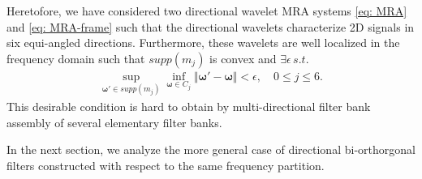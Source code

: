 

Heretofore, we have considered two directional wavelet MRA systems \eqref{eq: MRA} and \eqref{eq: MRA-frame} such that the directional wavelets characterize 2D signals in six equi-angled directions. 
Furthermore, these wavelets are well localized in the frequency domain such that $supp(m_j)$ is convex and $\exists\epsilon\, s.t.$
\begin{align}\label{eq: no-alians}
 \sup_{\boldsymbol{\omega}'\in supp(m_j)}\inf_{\boldsymbol{\omega}\in C_j}\Vert\boldsymbol{\omega'} - \boldsymbol{\omega}\Vert < \epsilon,\quad  0\leq j\leq 6.
\end{align}
This desirable condition is hard to obtain by multi-directional filter bank assembly of several elementary filter banks.

In the next section, we analyze the more general case of directional bi-orthorgonal filters constructed with respect to the same frequency partition. 